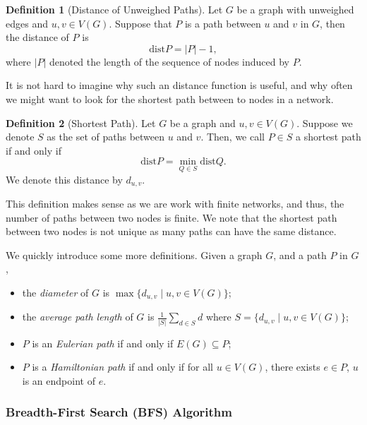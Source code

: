 \documentclass[
]{article}
\theoremstyle{definition}
\theoremstyle{definition}
\newtheorem{definition}{Definition}[section]
\begin{document}
\begin{definition}[Distance of Unweighed Paths]
  Let \(G\) be a graph with unweighed edges and \(u, v \in V(G)\). Suppose that 
  \(P\) is a path between \(u\) and \(v\) in \(G\), then the distance of \(P\) is
  \[\text{dist} P = \left| P \right| - 1, \] 
  where \(\left| P \right|\) denoted the length of the sequence of nodes induced 
  by \(P\).
\end{definition}

It is not hard to imagine why such an distance function is useful, and
why often we might want to look for the shortest path between to nodes
in a network.

\begin{definition}[Shortest Path]
  Let \(G\) be a graph and \(u, v \in V(G)\). Suppose we denote \(S\) as the set 
  of paths between \(u\) and \(v\). Then, we call \(P \in S\) a shortest path 
  if and only if 
  \[ \text{dist} P = \min_{Q \in S} \text{dist} Q.\]
  We denote this distance by \(d_{u, v}\).
\end{definition}

This definition makes sense as we are work with finite networks, and
thus, the number of paths between two nodes is finite. We note that the
shortest path between two nodes is not unique as many paths can have the
same distance.

We quickly introduce some more definitions. Given a graph \(G\), and a
path \(P\) in \(G\),

\begin{itemize}
  \item the \textit{diameter} of \(G\) is \(\max \{d_{u, v} \mid u, v \in V(G)\}\);
  \item the \textit{average path length} of \(G\) is 
    \(\frac{1}{\left| S \right|} \sum_{d \in S} d\) 
    where \(S = \{d_{u, v} \mid u, v \in V(G)\}\);
  \item \(P\) is an \textit{Eulerian path} if and only if \(E(G) \subseteq P\);
  \item \(P\) is a \textit{Hamiltonian path} if and only if for all 
    \(u \in V(G)\), there exists \(e \in P\), \(u\) is an endpoint of \(e\).
\end{itemize}

\hypertarget{breadth-first-search-bfs-algorithm}{%
\subsubsection{Breadth-First Search (BFS)
Algorithm}\label{breadth-first-search-bfs-algorithm}}
\end{document}
